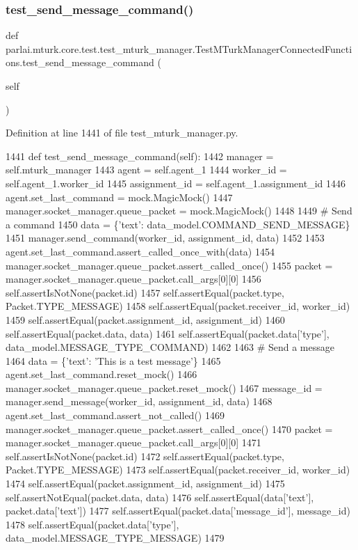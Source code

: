 \subsubsection{\texorpdfstring{test\+\_\+send\+\_\+message\+\_\+command()}{test\_send\_message\_command()}}
{\footnotesize\ttfamily def parlai.\+mturk.\+core.\+test.\+test\+\_\+mturk\+\_\+manager.\+Test\+M\+Turk\+Manager\+Connected\+Functions.\+test\+\_\+send\+\_\+message\+\_\+command (\begin{DoxyParamCaption}\item[{}]{self }\end{DoxyParamCaption})}



Definition at line 1441 of file test\+\_\+mturk\+\_\+manager.\+py.


\begin{DoxyCode}
1441     \textcolor{keyword}{def }test\_send\_message\_command(self):
1442         manager = self.mturk\_manager
1443         agent = self.agent\_1
1444         worker\_id = self.agent\_1.worker\_id
1445         assignment\_id = self.agent\_1.assignment\_id
1446         agent.set\_last\_command = mock.MagicMock()
1447         manager.socket\_manager.queue\_packet = mock.MagicMock()
1448 
1449         \textcolor{comment}{# Send a command}
1450         data = \{\textcolor{stringliteral}{'text'}: data\_model.COMMAND\_SEND\_MESSAGE\}
1451         manager.send\_command(worker\_id, assignment\_id, data)
1452 
1453         agent.set\_last\_command.assert\_called\_once\_with(data)
1454         manager.socket\_manager.queue\_packet.assert\_called\_once()
1455         packet = manager.socket\_manager.queue\_packet.call\_args[0][0]
1456         self.assertIsNotNone(packet.id)
1457         self.assertEqual(packet.type, Packet.TYPE\_MESSAGE)
1458         self.assertEqual(packet.receiver\_id, worker\_id)
1459         self.assertEqual(packet.assignment\_id, assignment\_id)
1460         self.assertEqual(packet.data, data)
1461         self.assertEqual(packet.data[\textcolor{stringliteral}{'type'}], data\_model.MESSAGE\_TYPE\_COMMAND)
1462 
1463         \textcolor{comment}{# Send a message}
1464         data = \{\textcolor{stringliteral}{'text'}: \textcolor{stringliteral}{'This is a test message'}\}
1465         agent.set\_last\_command.reset\_mock()
1466         manager.socket\_manager.queue\_packet.reset\_mock()
1467         message\_id = manager.send\_message(worker\_id, assignment\_id, data)
1468         agent.set\_last\_command.assert\_not\_called()
1469         manager.socket\_manager.queue\_packet.assert\_called\_once()
1470         packet = manager.socket\_manager.queue\_packet.call\_args[0][0]
1471         self.assertIsNotNone(packet.id)
1472         self.assertEqual(packet.type, Packet.TYPE\_MESSAGE)
1473         self.assertEqual(packet.receiver\_id, worker\_id)
1474         self.assertEqual(packet.assignment\_id, assignment\_id)
1475         self.assertNotEqual(packet.data, data)
1476         self.assertEqual(data[\textcolor{stringliteral}{'text'}], packet.data[\textcolor{stringliteral}{'text'}])
1477         self.assertEqual(packet.data[\textcolor{stringliteral}{'message\_id'}], message\_id)
1478         self.assertEqual(packet.data[\textcolor{stringliteral}{'type'}], data\_model.MESSAGE\_TYPE\_MESSAGE)
1479 
\end{DoxyCode}
